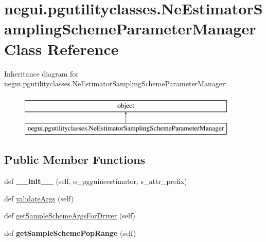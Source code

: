 \hypertarget{classnegui_1_1pgutilityclasses_1_1NeEstimatorSamplingSchemeParameterManager}{}\section{negui.\+pgutilityclasses.\+Ne\+Estimator\+Sampling\+Scheme\+Parameter\+Manager Class Reference}
\label{classnegui_1_1pgutilityclasses_1_1NeEstimatorSamplingSchemeParameterManager}
Inheritance diagram for negui.\+pgutilityclasses.\+Ne\+Estimator\+Sampling\+Scheme\+Parameter\+Manager\+:\begin{figure}[H]
\begin{center}
\leavevmode
\includegraphics[height=2.000000cm]{classnegui_1_1pgutilityclasses_1_1NeEstimatorSamplingSchemeParameterManager}
\end{center}
\end{figure}
\subsection*{Public Member Functions}
\begin{DoxyCompactItemize}
\item 
def {\bfseries \+\_\+\+\_\+init\+\_\+\+\_\+} (self, o\+\_\+pgguineestimator, s\+\_\+attr\+\_\+prefix)\hypertarget{classnegui_1_1pgutilityclasses_1_1NeEstimatorSamplingSchemeParameterManager_a1d324f75ea8bd9698dc0f5d0c27a46e2}{}\label{classnegui_1_1pgutilityclasses_1_1NeEstimatorSamplingSchemeParameterManager_a1d324f75ea8bd9698dc0f5d0c27a46e2}

\item 
def \hyperlink{classnegui_1_1pgutilityclasses_1_1NeEstimatorSamplingSchemeParameterManager_a0d0a4f323eedc2f1ffbb0fc75202250b}{validate\+Args} (self)
\item 
def \hyperlink{classnegui_1_1pgutilityclasses_1_1NeEstimatorSamplingSchemeParameterManager_a227ced553bf15b1ec8df62adc9579907}{get\+Sample\+Scheme\+Args\+For\+Driver} (self)
\item 
def {\bfseries get\+Sample\+Scheme\+Pop\+Range} (self)\hypertarget{classnegui_1_1pgutilityclasses_1_1NeEstimatorSamplingSchemeParameterManager_a626f3319c02f91c55335c5a3b61c5dbf}{}\label{classnegui_1_1pgutilityclasses_1_1NeEstimatorSamplingSchemeParameterManager_a626f3319c02f91c55335c5a3b61c5dbf}

\end{DoxyCompactItemize}
